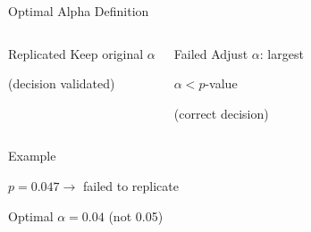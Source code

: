 
\begin{frame}{Optimal Alpha Definition}
	
	\begin{columns}[T]
		
		\begin{block}{Replicated}
			Keep original $\alpha$  
			
			(decision validated)
		\end{block}
		
		\begin{alertblock}{Failed}
			Adjust $\alpha$: largest  
			
			$\alpha < p$-value  
			
			(correct decision)
		\end{alertblock}
		
	\end{columns}
	
	\vspace{0.5cm}
	
	\begin{exampleblock}{Example}
		
		$p = 0.047 \rightarrow$ failed to replicate  
		
		Optimal $\alpha = 0.04$ (not 0.05)
		
	\end{exampleblock}
	

\end{frame}

